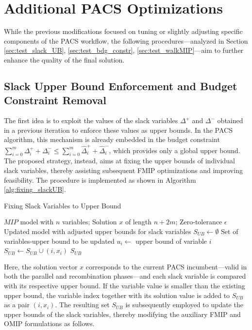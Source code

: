 \section{Additional PACS Optimizations}
While the previous modifications focused on tuning or slightly adjusting specific components of the PACS workflow, the following procedures—analyzed in Section \ref{sec:test_slack_UB}, \ref{sec:test_bdg_constr}, \ref{sec:test_walkMIP}—aim to further enhance the quality of the final solution.

\subsection{Slack Upper Bound Enforcement and Budget Constraint Removal}\label{sec:slack_UB_BDG_constr}
The first idea is to exploit the values of the slack variables $\Delta^+$ and $\Delta^-$ obtained in a previous iteration to enforce these values as upper bounds.  
In the PACS algorithm, this mechanism is already embedded in the budget constraint $\sum_{i=0}^m \Delta_i^{+}+\Delta_i^{-} \le \sum_{i=0}^m \hat\Delta_i^{+}+\hat\Delta_i^{-}$, which provides only a global upper bound. The proposed strategy, instead, aims at fixing the upper bounds of individual slack variables, thereby assisting subsequent FMIP optimizations and improving feasibility.  
The procedure is implemented as shown in Algorithm \ref{alg:fixing_slackUB}.  
\begin{algorithm}[H]
\caption{Fixing Slack Variables to Upper Bound}\label{alg:fixing_slackUB}
\begin{algorithmic}[1]
\Require $MIP$ model with $n$ variables; Solution $x$ of length $n+2m$; Zero-tolerance $\epsilon$
\Ensure Updated model with adjusted upper bounds for slack variables
    \State $S_{UB} \gets \emptyset$ \Comment Set of variables-upper bound to be updated
        \State $u_i \gets$ upper bound of variable $i$
            \State $S_{UB} \gets  S_{UB} \cup (i,x_i)$
        \EndIf
    \EndFor
    \State \Return $S_{UB}$
\EndFunction
\end{algorithmic}
\end{algorithm}
Here, the solution vector $x$ corresponds to the current PACS incumbent—valid in both the parallel and recombination phases—and each slack variable is compared with its respective upper bound. If the variable value is smaller than the existing upper bound, the variable index together with its solution value is added to $S_{UB}$ as a pair $(i, x_i)$.
The resulting set $S_{UB}$ is subsequently employed to update the upper bounds of the slack variables, thereby modifying the auxiliary FMIP and OMIP formulations as follows.

